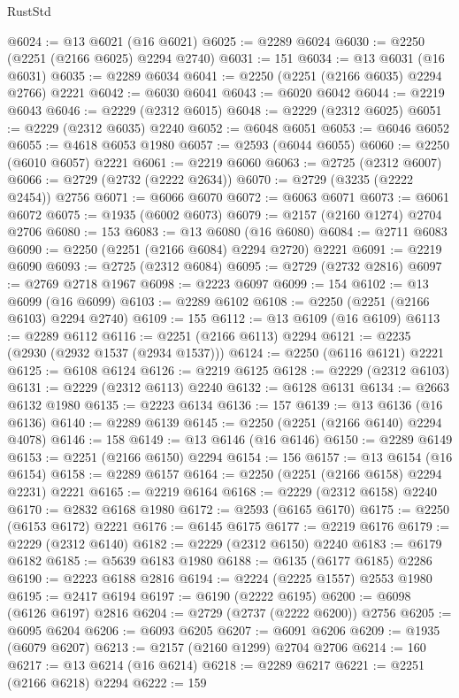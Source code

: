 \begin{lexlean}{RustStd}
\begin{coremodule}
{\begin{coremodule}
{{{{{{{{{{{{{{{{{{{{{{{{{{{{{{{{{{{{{{{{{{{{{{{{{{{{{@6024 := @13 @6021 (@16 @6021)
@6025 := @2289 @6024
@6030 := @2250 (@2251 (@2166 @6025) @2294 @2740)
@6031 := 151
@6034 := @13 @6031 (@16 @6031)
@6035 := @2289 @6034
@6041 := @2250 (@2251 (@2166 @6035) @2294 @2766) @2221
@6042 := @6030 @6041
@6043 := @6020 @6042
@6044 := @2219 @6043
@6046 := @2229 (@2312 @6015)
@6048 := @2229 (@2312 @6025)
@6051 := @2229 (@2312 @6035) @2240
@6052 := @6048 @6051
@6053 := @6046 @6052
@6055 := @4618 @6053 @1980
@6057 := @2593 (@6044 @6055)
@6060 := @2250 (@6010 @6057) @2221
@6061 := @2219 @6060
@6063 := @2725 (@2312 @6007)
@6066 := @2729 (@2732 (@2222 @2634))
@6070 := @2729 (@3235 (@2222 @2454)) @2756
@6071 := @6066 @6070
@6072 := @6063 @6071
@6073 := @6061 @6072
@6075 := @1935 (@6002 @6073)
@6079 := @2157 (@2160 @1274) @2704 @2706
@6080 := 153
@6083 := @13 @6080 (@16 @6080)
@6084 := @2711 @6083
@6090 := @2250 (@2251 (@2166 @6084) @2294 @2720) @2221
@6091 := @2219 @6090
@6093 := @2725 (@2312 @6084)
@6095 := @2729 (@2732 @2816)
@6097 := @2769 @2718 @1967
@6098 := @2223 @6097
@6099 := 154
@6102 := @13 @6099 (@16 @6099)
@6103 := @2289 @6102
@6108 := @2250 (@2251 (@2166 @6103) @2294 @2740)
@6109 := 155
@6112 := @13 @6109 (@16 @6109)
@6113 := @2289 @6112
@6116 := @2251 (@2166 @6113) @2294
@6121 := @2235 (@2930 (@2932 @1537 (@2934 @1537)))
@6124 := @2250 (@6116 @6121) @2221
@6125 := @6108 @6124
@6126 := @2219 @6125
@6128 := @2229 (@2312 @6103)
@6131 := @2229 (@2312 @6113) @2240
@6132 := @6128 @6131
@6134 := @2663 @6132 @1980
@6135 := @2223 @6134
@6136 := 157
@6139 := @13 @6136 (@16 @6136)
@6140 := @2289 @6139
@6145 := @2250 (@2251 (@2166 @6140) @2294 @4078)
@6146 := 158
@6149 := @13 @6146 (@16 @6146)
@6150 := @2289 @6149
@6153 := @2251 (@2166 @6150) @2294
@6154 := 156
@6157 := @13 @6154 (@16 @6154)
@6158 := @2289 @6157
@6164 := @2250 (@2251 (@2166 @6158) @2294 @2231) @2221
@6165 := @2219 @6164
@6168 := @2229 (@2312 @6158) @2240
@6170 := @2832 @6168 @1980
@6172 := @2593 (@6165 @6170)
@6175 := @2250 (@6153 @6172) @2221
@6176 := @6145 @6175
@6177 := @2219 @6176
@6179 := @2229 (@2312 @6140)
@6182 := @2229 (@2312 @6150) @2240
@6183 := @6179 @6182
@6185 := @5639 @6183 @1980
@6188 := @6135 (@6177 @6185) @2286
@6190 := @2223 @6188 @2816
@6194 := @2224 (@2225 @1557) @2553 @1980
@6195 := @2417 @6194
@6197 := @6190 (@2222 @6195)
@6200 := @6098 (@6126 @6197) @2816
@6204 := @2729 (@2737 (@2222 @6200)) @2756
@6205 := @6095 @6204
@6206 := @6093 @6205
@6207 := @6091 @6206
@6209 := @1935 (@6079 @6207)
@6213 := @2157 (@2160 @1299) @2704 @2706
@6214 := 160
@6217 := @13 @6214 (@16 @6214)
@6218 := @2289 @6217
@6221 := @2251 (@2166 @6218) @2294
@6222 := 159
}}}}}}}}}}}}}}}}}}}}}}}}}}}}}}}}}}}}}}}}}}}}}}}}}}}}}
\end{coremodule}}
\end{coremodule}
\end{lexlean}
